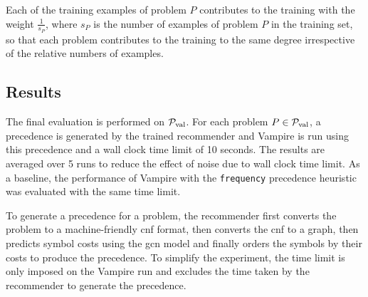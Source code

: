 Each of the training examples of problem $P$ contributes to the training with the weight $\frac{1}{s_P}$,
where $s_P$ is the number of examples of problem $P$ in the training set,
so that each problem contributes to the training to the same degree irrespective of the relative numbers of examples.

\subsection{Results}

The final evaluation is performed on $\operatorname{\mathcal{P}_{\mathrm{val}}}$.
For each problem $P \in \operatorname{\mathcal{P}_{\mathrm{val}}}$,
a precedence is generated by the trained recommender
and Vampire is run using this precedence and a wall clock time limit of 10 seconds.
The results are averaged over 5 runs to reduce the effect of noise due to wall clock time limit.
As a baseline, the performance of Vampire with the \texttt{frequency} precedence heuristic was evaluated
with the same time limit.

To generate a precedence for a problem,
the recommender first converts the problem to a machine-friendly \gls{cnf} format,
then converts the \gls{cnf} to a graph,
then predicts symbol costs using the \gls{gcn} model
and finally orders the symbols by their costs to produce the precedence.
To simplify the experiment, the time limit is only imposed on the Vampire run
and excludes the time taken by the recommender to generate the precedence.


